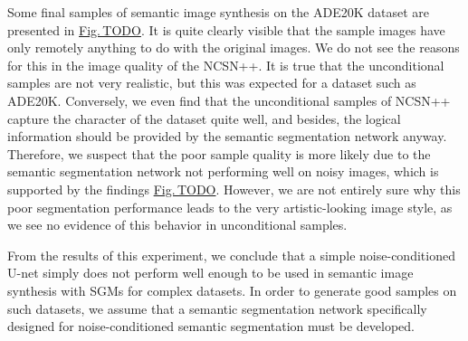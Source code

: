 Some final samples of semantic image synthesis on the ADE20K dataset are presented in \hyperref[fig:]{Fig.\,TODO}. It is quite clearly visible that the sample images have only remotely anything to do with the original images. We do not see the reasons for this in the image quality of the NCSN++. It is true that the unconditional samples are not very realistic, but this was expected for a dataset such as ADE20K. Conversely, we even find that the unconditional samples of NCSN++ capture the character of the dataset quite well, and besides, the logical information should be provided by the semantic segmentation network anyway. Therefore, we suspect that the poor sample quality is more likely due to the semantic segmentation network not performing well on noisy images, which is supported by the findings \hyperref[fig:]{Fig.\,TODO}. However, we are not entirely sure why this poor segmentation performance leads to the very artistic-looking image style, as we see no evidence of this behavior in unconditional samples.

From the results of this experiment, we conclude that a simple noise-conditioned U-net simply does not perform well enough to be used in semantic image synthesis with SGMs for complex datasets. In order to generate good samples on such datasets, we assume that a semantic segmentation network specifically designed for noise-conditioned semantic segmentation must be developed.

